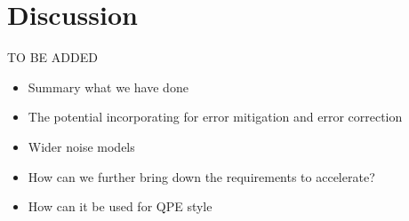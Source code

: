 \section{Discussion} \label{sec::discussion}
TO BE ADDED
\begin{itemize}
	\item Summary what we have done
	\item The potential incorporating for error mitigation and error correction
	\item Wider noise models
	\item How can we further bring down the requirements to accelerate?
	\item How can it be used for QPE style
\end{itemize}



\newpage
